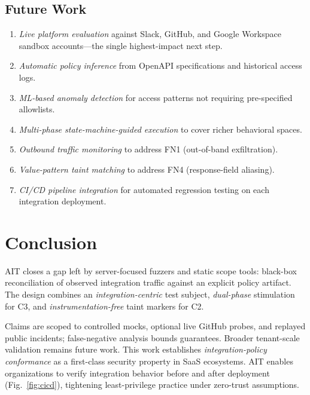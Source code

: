\documentclass[conference]{IEEEtran}
\begin{document}
\subsection{Future Work}
\label{sec:future}

\begin{enumerate}
  \item \emph{Live platform evaluation} against Slack, GitHub, and
        Google Workspace sandbox accounts---the single highest-impact
        next step.
  \item \emph{Automatic policy inference} from OpenAPI specifications
        and historical access logs.
  \item \emph{ML-based anomaly detection} for access patterns not
        requiring pre-specified allowlists.
  \item \emph{Multi-phase state-machine-guided execution} to cover
        richer behavioral spaces.
  \item \emph{Outbound traffic monitoring} to address FN1
        (out-of-band exfiltration).
  \item \emph{Value-pattern taint matching} to address FN4
        (response-field aliasing).
  \item \emph{CI/CD pipeline integration} for automated regression
        testing on each integration deployment.
\end{enumerate}

\section{Conclusion}
\label{sec:conc}

AIT closes a gap left by server-focused fuzzers and static scope tools:
black-box reconciliation of observed integration traffic against an
explicit policy artifact. The design combines an \emph{integration-centric}
test subject, \emph{dual-phase} stimulation for C3, and
\emph{instrumentation-free} taint markers for C2.

Claims are scoped to controlled mocks, optional live GitHub probes, and
replayed public incidents; false-negative analysis bounds guarantees.
Broader tenant-scale validation remains future work.
This work establishes \emph{integration-policy conformance} as a
first-class security property in SaaS ecosystems.
AIT enables organizations to verify integration behavior before and after
deployment (Fig.~\ref{fig:cicd}), tightening least-privilege practice under
zero-trust assumptions.
\end{document}
